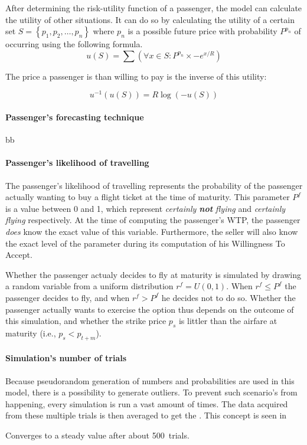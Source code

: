 After determining the risk-utility function of a passenger, the model can calculate the utility of other situations. It can do so by calculating the utility of a certain set $S = \left\{ p_1, p_2, \ldots, p_n\right\}$ where $p_n$ is a possible future price with probability $P^{p_n}$ of occurring using the following formula.
$$
u(S) = \sum (\forall x \in S: P^{p_n} \times -e^{x/R})
$$

The price a passenger is than willing to pay is the inverse of this utility:

$$
u^{-1}(u(S)) = R \log(-u(S))
$$


\paragraph{Passenger's forecasting technique}
bb

\paragraph{Passenger's likelihood of travelling}
The passenger's likelihood of travelling represents the probability of the passenger actually wanting to buy a flight ticket at the time of maturity. This parameter $P^f$ is a value between 0 and 1, which represent \emph{certainly \textbf{not} flying} and \emph{certainly flying} respectively. At the time of computing the passenger's WTP, the passenger \emph{does} know the exact value of this variable. Furthermore, the seller will also know the exact level of the parameter during its computation of his Willingness To Accept.

Whether the passenger actualy decides to fly at maturity is simulated by drawing a random variable from a uniform distribution $r^f = U(0,1)$. When $r^f \le P^f$ the passenger decides to fly, and when $r^f > P^f$ he decides not to do so. Whether the passenger actually wants to exercise the option thus depends on the outcome of this simulation, and whether the strike price $p_s$ is littler than the airfare at maturity (i.e., $p_s < p_{t+m}$).

\paragraph{Simulation's number of trials}
Because pseudorandom generation of numbers and probabilities are used in this model, there is a possibility to generate outliers. To prevent such scenario's from happening, every simulation is run a vast amount of times. The data acquired from these multiple trials is then averaged to get the . This concept is seen in 

Converges to a steady value after about 500~trials.










